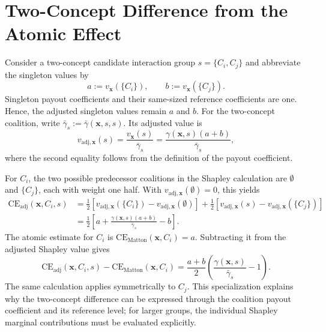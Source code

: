 \section*{Two-Concept Difference from the Atomic Effect}
\begin{math_box}[label=ma:two_concept_ce_difference]
    Consider a two-concept candidate interaction group
    $s=\{C_i,C_j\}$ and abbreviate the singleton values by
    \begin{equation}
        a:=v_{\mathbf{x}}(\{C_i\}),
        \qquad
        b:=v_{\mathbf{x}}(\{C_j\}).
    \end{equation}
    Singleton payout coefficients and their same-sized reference coefficients are
    one. Hence, the adjusted singleton values remain $a$ and $b$. For the
    two-concept coalition, write
    $\bar\gamma_s:=\bar\gamma(\mathbf{x},s,s)$. Its adjusted value is
    \begin{equation}
        v_{\mathrm{adj},\mathbf{x}}(s)
        =
        \frac{v_{\mathbf{x}}(s)}{\bar\gamma_s}
        =
        \frac{\gamma(\mathbf{x},s)(a+b)}{\bar\gamma_s},
    \end{equation}
    where the second equality follows from the definition of the payout
    coefficient.

    For $C_i$, the two possible predecessor coalitions in the Shapley
    calculation are $\emptyset$ and $\{C_j\}$, each with weight one half.
    With $v_{\mathrm{adj},\mathbf{x}}(\emptyset)=0$, this yields
    \begin{align}
        \mathrm{CE}_{\mathrm{adj}}(\mathbf{x},C_i,s)
        & = \frac{1}{2}
        \left[
        v_{\mathrm{adj},\mathbf{x}}(\{C_i\})
        -v_{\mathrm{adj},\mathbf{x}}(\emptyset)
        \right]
        + \frac{1}{2}
        \left[
        v_{\mathrm{adj},\mathbf{x}}(s)
        -v_{\mathrm{adj},\mathbf{x}}(\{C_j\})
        \right] \\
        & = \frac{1}{2}
        \left[
        a + \frac{\gamma(\mathbf{x},s)(a+b)}{\bar\gamma_s} - b
        \right].
    \end{align}
    The atomic estimate for $C_i$ is
    $\mathrm{CE}_{\mathrm{Matton}}(\mathbf{x},C_i)=a$. Subtracting it from
    the adjusted Shapley value gives
    \begin{equation}
        \mathrm{CE}_{\mathrm{adj}}(\mathbf{x},C_i,s)
        - \mathrm{CE}_{\mathrm{Matton}}(\mathbf{x},C_i)
        =
        \frac{a+b}{2}
        \left(
        \frac{\gamma(\mathbf{x},s)}{\bar\gamma_s}-1
        \right).
    \end{equation}
    The same calculation applies symmetrically to $C_j$. This specialization
    explains why the two-concept difference can be expressed through the
    coalition payout coefficient and its reference level; for larger groups,
    the individual Shapley marginal contributions must be evaluated explicitly.
\end{math_box}

